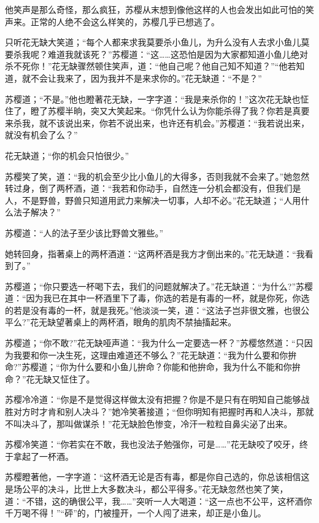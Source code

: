 \documentclass[12pt,oneside]{book}
\begin{document}
他笑声是那么奇怪，那么疯狂，苏樱从末想到像他这样的人也会发出如此可怕的笑声来。正常的人绝不会这么样笑的，苏樱几乎已想逃了。

只听花无缺大笑道；``每个人都来求我莫要杀小鱼儿，为升么没有人去求小鱼儿莫要杀我呢？难道我就该死？''苏樱道：``这\ldots\ldots 这恐怕是因为大家都知道小鱼儿绝对杀不死你！''花无缺骤然顿住笑声，道：``他自己呢？他自己知不知道？''``他若知道，就不会让我来了，因为我并不是来求你的。''花无缺道：``不是？''

苏樱道；``不是。''他也瞪著花无缺，一字字道：``我是来杀你的！''这次花无缺也怔住了，瞪了苏樱半晌，突又大笑起来。``你凭什么认为你能杀得了我？你若是真要来杀我，就不该说出来，你若不说出来，也许还有机会。''苏樱道：``我若说出来，就没有机会了么？''

花无缺道；``你的机会只怕很少。''

苏樱笑了笑，道：``我的机会至少比小鱼儿的大得多，否则我就不会来了。''她忽然转过身，倒了两杯酒，道：``我若和你动手，自然连一分机会都没有，但我们是人，不是野兽，野兽只知道用武力来解决一切事，人却不必。''花无缺道；``人用什么法子解决？''

苏樱道：``人的法子至少该比野兽文雅些。''

她转回身，指著桌上的两杯酒道：``这两杯酒是我方才倒出来的。''花无缺道：``我看到了。''

苏樱道；``你只要选一杯喝下去，我们的问题就解决了。''花无缺道：``为什么?''苏樱道：``因为我已在其中一杯酒里下了毒，你选的若是有毒的一杯，就是你死，你选的若是没有毒的一杯，就是我死。''他淡淡一笑，道：``这法子岂非很文雅，也很公平么?''花无缺望著桌上的两杯酒，眼角的肌肉不禁抽搐起来。

苏樱道；``你不敢?''花无缺哑声道：``我为什么一定要选一杯？''苏樱悠然道：``只因为我要和你一决生死，这理由难道还不够么？''花无缺道：``我为什么要和你拚命?''苏樱道；``你为什么要和小鱼儿拚命？你能和他拚命，我为什么不能和你拚命？''花无缺又怔住了。

苏樱冷冷道：``你是不是觉得这样做太没有把握？你是不是只有在明知自己能够战胜对方时才肯和别人决斗？''她冷笑著接道；``但你明知有把握时再和人决斗，那就不叫决斗了，那叫做谋杀！''花无缺脸色惨变，冷汗一粒粒自鼻尖泌了出来。

苏樱冷笑道：``你若实在不敢，我也没法子勉强你，可是\ldots\ldots{}''花无缺咬了咬牙，终于拿起了一杯酒。

苏樱瞪著他，一字字道：``这杯酒无论是否有毒，都是你自己选的，你总该相信这是场公平的决斗，比世上大多数决斗，都公平得多。''花无缺忽然也笑了笑，道：``不错，这的确很公平，我\ldots\ldots{}''突听一人大喝道：``这一点也不公平，这杯酒你千万喝不得！''``砰''的，门被撞开，一个人闯了进来，却正是小鱼儿。
\end{document}
